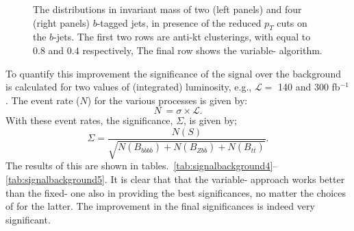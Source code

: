\begin{figure}[htb!]
	\caption{The distributions in invariant mass of two (left panels) and four (right panels) $b$-tagged jets, in presence of the
  reduced $p_T$ cuts on the $b$-jets.
  The first two rows are anti-kt clusterings, with \stoppingdeltar{} equal to \(0.8\) and \(0.4\) respectively,
  The final row shows the variable-\stoppingdeltar{} algorithm.}
\label{fig:invmass2}
\end{figure}


To quantify this improvement the significance of the signal over the background is calculated for two values of (integrated)  luminosity, e.g.,  ${\mathcal{L}}=$  140 and 300 fb$^{-1}$.
The event rate ($N$) for the various processes is given by:
%
\begin{equation}
N \ = \sigma \times \mathcal{L}.
\end{equation}
%
With these event rates, the significance, $\Sigma$, is given by;
%
\begin{equation}
\Sigma = \frac{N(S)}{\sqrt{N(B_{b\bar{b}b\bar{b}})+N(B_{Zb\bar{b}})+N(B_{t\bar{t}})}}.
\end{equation}
%
The results of this are shown in tables.~\ref{tab:signalbackground4}--\ref{tab:signalbackground5}.
It is clear that that the variable-\stoppingdeltar{} approach works better than the fixed-\stoppingdeltar{} one also in providing the best significances, no matter the choices of \stoppingdeltar{} for the latter.  The improvement in the final significances is indeed very significant.



\begin{table}[!h]
\begin{center}
\caption{\label{tab:signalbackground4} Final $\Sigma$ values calculated for signal and backgrounds for ${\cal L}=140$ fb$^{-1}$  upon enforcing the reduced cuts plus the mass selection criteria $|m_{bbbb}-m_H|< 20$ GeV and $|m_{bb} - m_h|< 15$ GeV for the various jet reconstruction procedures.}
\end{center}
\end{table}

